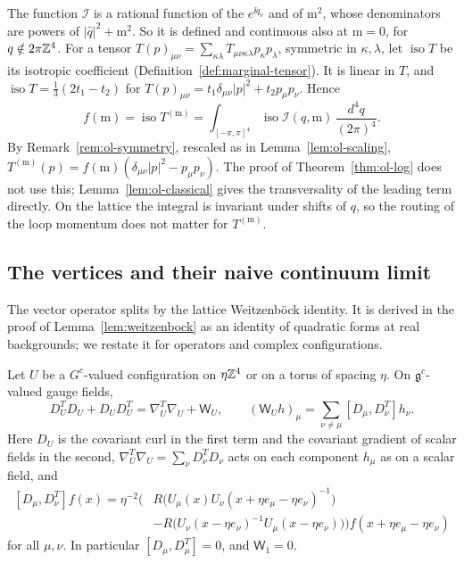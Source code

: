 The function $\mathcal I$ is a rational function of the $e^{\ii q_\nu}$ and of $\mathrm m^2$, whose denominators are powers of $|\hat q|^2+\mathrm m^2$. So it is defined and continuous also at $\mathrm m=0$, for $q\notin2\pi\mathbb Z^4$. For a tensor $T(p)_{\mu\nu}=\sum_{\kappa\lambda}T_{\mu\nu\kappa\lambda}p_\kappa p_\lambda$, symmetric in $\kappa,\lambda$, let $\operatorname{iso}T$ be its isotropic coefficient (Definition~\ref{def:marginal-tensor}). It is linear in $T$, and $\operatorname{iso}T=\frac13(2t_1-t_2)$ for $T(p)_{\mu\nu}=t_1\delta_{\mu\nu}|p|^2+t_2p_\mu p_\nu$. Hence
\[
f(\mathrm m)=\operatorname{iso}T^{(\mathrm m)}=\int_{[-\pi,\pi]^4}\operatorname{iso}\mathcal I(q,\mathrm m)\,\frac{d^4q}{(2\pi)^4}.
\]
By Remark~\ref{rem:ol-symmetry}, rescaled as in Lemma~\ref{lem:ol-scaling}, $T^{(\mathrm m)}(p)=f(\mathrm m)(\delta_{\mu\nu}|p|^2-p_\mu p_\nu)$. The proof of Theorem~\ref{thm:ol-log} does not use this; Lemma~\ref{lem:ol-classical} gives the transversality of the leading term directly. On the lattice the integral is invariant under shifts of $q$, so the routing of the loop momentum does not matter for $T^{(\mathrm m)}$.

\subsection{The vertices and their naive continuum limit}\label{subsec:ol-vertices}

The vector operator splits by the lattice Weitzenb\"ock identity. It is derived in the proof of Lemma~\ref{lem:weitzenbock} as an identity of quadratic forms at real backgrounds; we restate it for operators and complex configurations.

\begin{lemma}\label{lem:ol-lattice-weitzenbock}
Let $U$ be a $G^c$-valued configuration on $\eta\mathbb Z^4$ or on a torus of spacing $\eta$. On $\mathfrak g^c$-valued gauge fields,
\[
D_U^TD_U+D_UD_U^T=\nabla_U^T\nabla_U+\mathsf W_U,\qquad(\mathsf W_Uh)_\mu=\sum_{\nu\ne\mu}[D_\mu,D_\nu^T]h_\nu .
\]
Here $D_U$ is the covariant curl in the first term and the covariant gradient of scalar fields in the second, $\nabla_U^T\nabla_U=\sum_\nu D_\nu^TD_\nu$ acts on each component $h_\mu$ as on a scalar field, and
\[
\begin{aligned}
[D_\mu,D^T_\nu]f(x)=\eta^{-2}\Big(&R\big(U_\mu(x)U_\nu(x+\eta e_\mu-\eta e_\nu)^{-1}\big)\\
&-R\big(U_\nu(x-\eta e_\nu)^{-1}U_\mu(x-\eta e_\nu)\big)\Big)f(x+\eta e_\mu-\eta e_\nu)
\end{aligned}
\]
for all $\mu,\nu$. In particular $[D_\mu,D_\mu^T]=0$, and $\mathsf W_1=0$.
\end{lemma}

